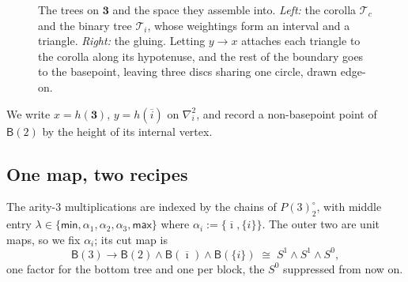 \documentclass[12pt]{amsart}
\theoremstyle{definition}
\theoremstyle{remark}
\newcommand{\BC}{\mathsf{B}}                     %
\newcommand{\TreeF}{\mathcal{T}}                 %
\newcommand{\basept}{\ast}
\begin{document}
\begin{figure}[htbp]
\caption{The trees on $\mathbf{3}$ and the space they assemble into. \emph{Left:} the corolla $\TreeF_c$ and the binary tree $\TreeF_i$, whose weightings form an interval and a triangle. \emph{Right:} the gluing. Letting $y\to x$ attaches each triangle to the corolla along its hypotenuse, and the rest of the boundary goes to the basepoint, leaving three discs sharing one circle, drawn edge-on.}
\label{fig:B3}
\end{figure}

We write $x = h(\mathbf{3})$, $y = h(\overline{i})$ on $\nabla^2_i$, and record a non-basepoint point of $\BC(2)$ by the height of its internal vertex.

\subsection*{One map, two recipes}
The arity-$3$ multiplications are indexed by the chains of $P(3)^{\circ}_2$, with middle entry $\lambda\in\{\mathsf{min},\alpha_1,\alpha_2,\alpha_3,\mathsf{max}\}$ where $\alpha_i := \{\overline{\imath},\{i\}\}$. The outer two are unit maps, so we fix $\alpha_i$; its cut map is
\[ \BC(3)\longrightarrow \BC(2)\wedge \BC(\overline{\imath})\wedge\BC(\{i\}) \;\cong\; S^1\wedge S^1\wedge S^0,\]
one factor for the bottom tree and one per block, the $S^0$ suppressed from now on.
\end{document}
